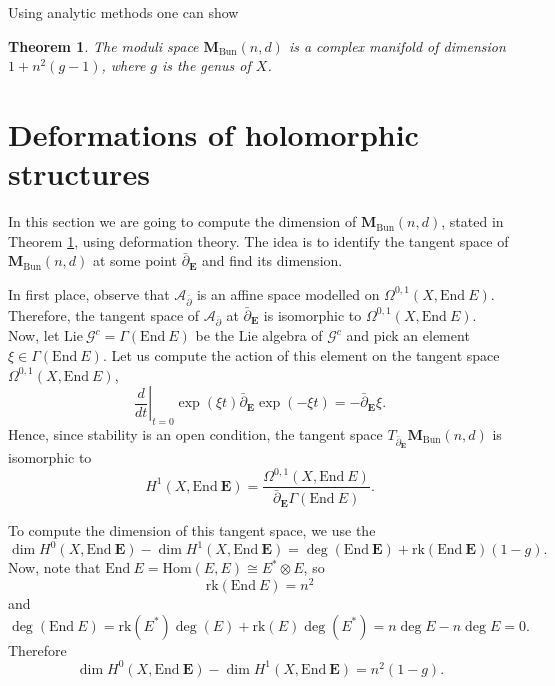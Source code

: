 \documentclass[12pt,a4paper]{book}
\newtheorem{thm}{Theorem}[section]
\theoremstyle{definition} \newtheorem{defn}[thm]{Definition}
\theoremstyle{definition} \newtheorem{ejemplo}[thm]{Example}
\theoremstyle{remark} \newtheorem{rem}[thm]{Remark}
\def\AA{\mathscr{A}}
\def\GG{\mathscr{G}}
\def\rk{\mathrm{rk}}
\def\Lie{\mathrm{Lie}}
\def\End{\mathrm{End}}
\def\Hom{\mathrm{Hom}}
\def\Bun{\mathbf{M}_{\mathrm{Bun}}}
\def\delbar{\bar{\partial}}
\newcommand{\ve}[1]{\mathbf{#1}}
\let\emph\relax
\begin{document}
	   Using analytic methods \cite{kobayashi} one can show
	   \begin{thm}\label{modulibundles}
	     The moduli space $\Bun(n,d)$ is a complex manifold of dimension $1+n^2(g-1)$, where $g$ is the genus of $X$.
	   \end{thm}

	   \section{Deformations of holomorphic structures}\label{deformationsholomorphic}
	   In this section we are going to compute the dimension of $\Bun(n,d)$, stated in Theorem \ref{modulibundles}, using deformation theory. The idea is to identify the tangent space of $\Bun(n,d)$ at some point $\delbar_\ve{E}$ and find its dimension. 

	   In first place, observe that $\AA_{\delbar}$ is an affine space modelled on $\Omega^{0,1}(X,\End\ E)$. Therefore, the tangent space of $\AA_{\delbar}$ at $\delbar_{\ve{E}}$ is isomorphic to $\Omega^{0,1}(X,\End\ E)$. Now, let $\Lie\ \GG^c = \Gamma(\End\ E)$ be the Lie algebra of $\GG^c$ and pick an element $\xi \in \Gamma(\End\ E)$. Let us compute the action of this element on the tangent space $\Omega^{0,1}(X,\End\ E)$,
	   \begin{equation*}
	     \left. \frac{d}{dt} \right|_{t=0} \exp(\xi t)  \delbar_{\ve{E}} \exp(-\xi t) = -\delbar_\ve{E} \xi.
	   \end{equation*}
	   Hence, since stability is an open condition, the tangent space $T_{\delbar_{\ve{E}}}\Bun(n,d)$ is isomorphic to
	   \begin{equation*}
	     H^1(X,\End\ \ve{E})=\frac{\Omega^{0,1}(X,\End\ E)}{\delbar_\ve{E} \Gamma(\End\ E)}.
	   \end{equation*}

	   To compute the dimension of this tangent space, we use the \emph{Riemann--Roch theorem}
	   \begin{equation*}
	     \dim H^0(X,\End\ \ve{E}) - \dim H^1(X,\End\ \ve{E})=\deg(\End\ \ve{E}) + \rk(\End\ \ve{E})(1-g).
	   \end{equation*}
	   Now, note that $\End\ E=\Hom(E,E)\cong E^*\otimes E$, so
	   \begin{equation*}
	     \rk(\End\ E)=n^2
	   \end{equation*}
	   and
	   \begin{equation*}
	     \deg(\End\ E)=\rk(E^*)\deg(E) + \rk(E)\deg(E^*)=n\deg E - n\deg E=0.
	   \end{equation*}
	   Therefore
	   \begin{equation*}
	     \dim H^0(X,\End\ \ve{E}) - \dim H^1(X,\End\ \ve{E})=n^2(1-g).
	   \end{equation*}
\end{document}
